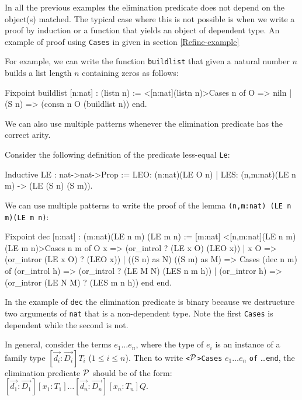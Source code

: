 In all the previous examples the elimination predicate does not depend
on the object(s) matched.  The typical case where this is not possible
is when we write a proof by induction or a function that yields an
object of dependent type. An example of proof using \texttt{Cases} in
given in section \ref{Refine-example}

For example, we can write 
the function \texttt{buildlist} that given a natural number
$n$ builds a list length $n$ containing zeros as follows:

\begin{coq_example}
Fixpoint buildlist [n:nat] : (listn n) :=
    <[n:nat](listn n)>Cases n of 
           O    => niln 
       |  (S n) => (consn n O (buildlist n))
       end.
\end{coq_example}

We can also use multiple patterns whenever the elimination predicate has
the correct arity. 

Consider the following definition of the predicate less-equal
\texttt{Le}:

\begin{coq_example}
Inductive LE : nat->nat->Prop :=
  LEO: (n:nat)(LE O n)
| LES: (n,m:nat)(LE n m) -> (LE (S n) (S m)).
\end{coq_example}

We can use multiple patterns to write  the proof of the lemma
 \texttt{(n,m:nat) (LE n m)\/(LE m n)}:

\begin{coq_example}
Fixpoint dec  [n:nat] : (m:nat)(LE n m) \/ (LE m n) :=
 [m:nat] <[n,m:nat](LE n m) \/ (LE m n)>Cases n m of
           O   x =>  (or_introl ? (LE x O) (LEO x))
         | x   O =>  (or_intror (LE x O) ? (LEO x))
         | ((S n) as N) ((S m) as M) =>
              Cases (dec n m) of
                  (or_introl h) => (or_introl ? (LE M N) (LES n m h))
               |  (or_intror h) => (or_intror (LE N M) ? (LES m n h))
              end
        end.
\end{coq_example}
In the example of \texttt{dec} the elimination predicate is binary
because we destructure two arguments of \texttt{nat} that is a
non-dependent type. Note the first \texttt{Cases} is dependent while the
second  is not.

In general, consider the terms $e_1\ldots e_n$,
where  the type of $e_i$ is an instance of a family type
$[\vec{d_i}:\vec{D_i}]T_i$  ($1\leq i
\leq n$). Then to  write \texttt{<}${\cal P}$\texttt{>Cases}  $e_1\ldots
e_n$ \texttt{of} \ldots \texttt{end}, the 
elimination predicate ${\cal P}$ should be of the form:
$[\vec{d_1}:\vec{D_1}][x_1:T_1]\ldots [\vec{d_n}:\vec{D_n}][x_n:T_n]Q.$

